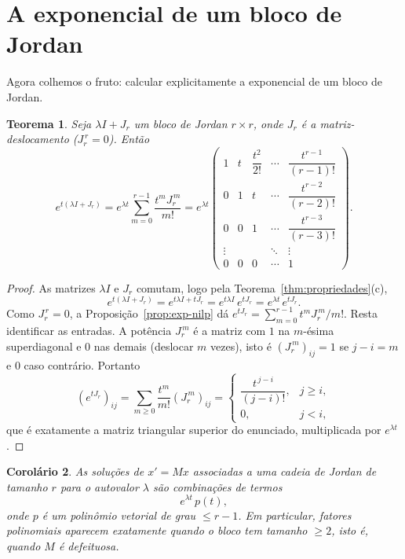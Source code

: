 \documentclass[11pt,a4paper]{amsart}
\theoremstyle{plain}
\newtheorem{teorema}{Teorema}[section]
\newtheorem{corolario}[teorema]{Corolário}
\theoremstyle{definition}
\theoremstyle{remark}
\begin{document}
\section{A exponencial de um bloco de Jordan}
\label{sec:exp-jordan}

Agora colhemos o fruto: calcular explicitamente a exponencial de um bloco de
Jordan.

\begin{teorema}\label{thm:exp-bloco}
Seja $\lambda I + J_r$ um bloco de Jordan $r\times r$, onde $J_r$ \'e a
matriz-deslocamento ($J_r^{\,r}=0$). Ent\~ao
\[
  e^{t(\lambda I + J_r)} = e^{\lambda t}\sum_{m=0}^{r-1}\frac{t^m J_r^{\,m}}{m!}
         = e^{\lambda t}
           \begin{pmatrix}
             1 & t & \dfrac{t^2}{2!} & \cdots & \dfrac{t^{r-1}}{(r-1)!}\\[2mm]
             0 & 1 & t & \cdots & \dfrac{t^{r-2}}{(r-2)!}\\[1mm]
             0 & 0 & 1 & \cdots & \dfrac{t^{r-3}}{(r-3)!}\\
             \vdots & & & \ddots & \vdots\\
             0 & 0 & 0 & \cdots & 1
           \end{pmatrix}.
\]
\end{teorema}

\begin{proof}
As matrizes $\lambda I$ e $J_r$ comutam, logo pela
Teorema~\ref{thm:propriedades}(c),
\[
  e^{t(\lambda I + J_r)} = e^{t\lambda I + tJ_r} = e^{t\lambda I}\,e^{tJ_r}
         = e^{\lambda t}\,e^{tJ_r}.
\]
Como $J_r^{\,r}=0$, a Proposi\c{c}\~ao~\ref{prop:exp-nilp} d\'a
$e^{tJ_r}=\sum_{m=0}^{r-1}t^m J_r^{\,m}/m!$. Resta identificar as entradas. A
pot\^encia $J_r^{\,m}$ \'e a matriz com $1$ na $m$-\'esima superdiagonal e $0$
nas demais (deslocar $m$ vezes), isto \'e $(J_r^{\,m})_{ij}=1$ se $j-i=m$ e $0$
caso contr\'ario. Portanto
\[
  (e^{tJ_r})_{ij}=\sum_{m\ge0}\frac{t^m}{m!}(J_r^{\,m})_{ij}
  = \begin{cases}\dfrac{t^{\,j-i}}{(j-i)!}, & j\ge i,\\[2mm] 0, & j<i,\end{cases}
\]
que \'e exatamente a matriz triangular superior do enunciado, multiplicada por
$e^{\lambda t}$.
\end{proof}

\begin{corolario}\label{cor:fatores}
As solu\c{c}\~oes de $x'=Mx$ associadas a uma cadeia de Jordan de tamanho $r$
para o autovalor $\lambda$ s\~ao combina\c{c}\~oes de termos
\[
  e^{\lambda t}\,p(t),
\]
onde $p$ \'e um polin\^omio vetorial de grau $\le r-1$. Em particular, fatores
polinomiais aparecem \emph{exatamente} quando o bloco tem tamanho $\ge2$, isto
\'e, quando $M$ \'e defeituosa.
\end{corolario}
\end{document}
